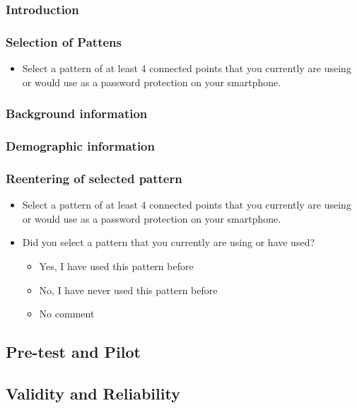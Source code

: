     \subsubsection*{Introduction}
    \subsubsection*{Selection of Pattens}
        \begin{itemize}
            \item  Select a pattern of at least 4 connected points that you currently are useing or would use as a password protection on your smartphone. 
        \end{itemize}
    \subsubsection*{Background information}
    \subsubsection*{Demographic information}
    \subsubsection*{Reentering of selected pattern}
        \begin{itemize}
            \item Select a pattern of at least 4 connected points that you currently are useing or would use as a password protection on your smartphone. 
            \item Did you select a pattern that you currently are using or have used?
                \begin{itemize}
                    \item Yes, I have used this pattern before
                    \item No, I have never used this pattern before
                    \item No comment
                \end{itemize}
        \end{itemize}


  \subsection{Pre-test and Pilot}

  \subsection{Validity and Reliability}





